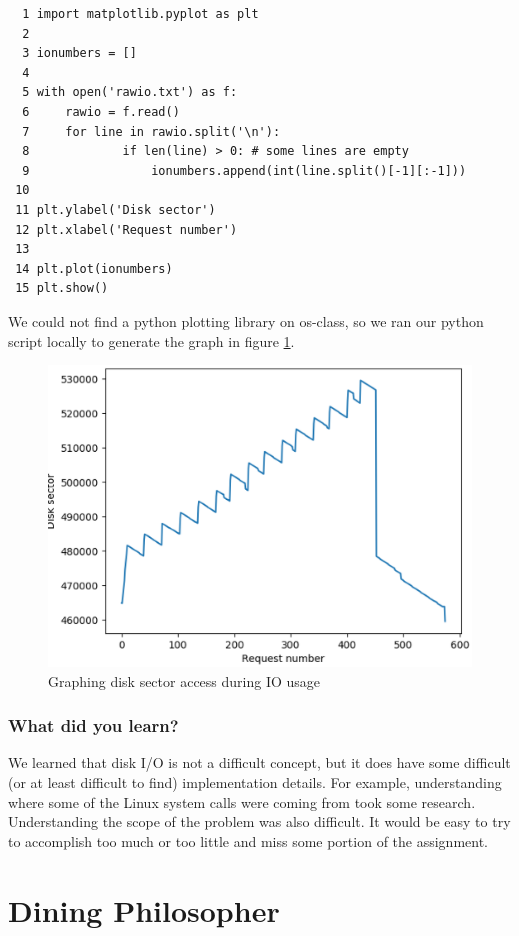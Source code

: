 \documentclass[journal,10pt,onecolumn,compsoc,letterpaper,draftclsnofoot,table,xcdraw]{IEEEtran} \usepackage[margin=0.75in]{geometry}
\begin{document}
\begin{verbatim}
  1 import matplotlib.pyplot as plt
  2 
  3 ionumbers = []
  4 
  5 with open('rawio.txt') as f:
  6     rawio = f.read()
  7     for line in rawio.split('\n'):
  8             if len(line) > 0: # some lines are empty
  9                 ionumbers.append(int(line.split()[-1][:-1]))
 10 
 11 plt.ylabel('Disk sector')
 12 plt.xlabel('Request number')
 13 
 14 plt.plot(ionumbers)
 15 plt.show()
\end{verbatim}

\noindent We could not find a python plotting library on os-class, so we ran our python script locally to generate the graph in figure \ref{iograph}.

\begin{figure}[H]
  \includegraphics[width=\textwidth]{io_plot_2.eps}
  \caption{Graphing disk sector access during IO usage}
  \label{iograph}
\end{figure}

\subsubsection{What did you learn?}
\noindent We learned that disk I/O is not a difficult concept, but it does have some difficult (or at least difficult to find) implementation details.  For example, understanding where some of the Linux system calls were coming from took some research.  Understanding the scope of the problem was also difficult.  It would be easy to try to accomplish too much or too little and miss some portion of the assignment.
\section{Dining Philosopher}
\end{document}
